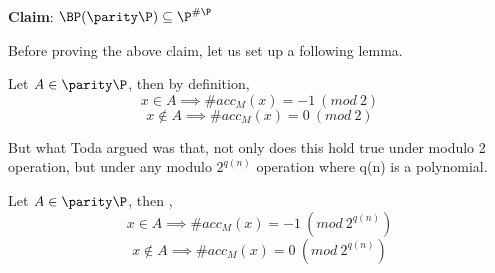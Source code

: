 
\textbf{Claim}: $\BP(\parity\P) \subseteq \P^{\#\P}$

Before proving the above claim, let us set up a following lemma. \newline

Let $A \in \parity \P$, then by definition, \newline
$$x \in A \implies \#acc_{M}(x) = -1~(mod~2)$$ 
$$x \notin A \implies \#acc_{M}(x) = 0~(mod~2)$$

But what Toda argued was that, not only does this hold true under modulo 2 operation, but under any modulo $2^{q(n)}$ operation where q(n) is a polynomial.

\begin{lemma}
 Let $A \in \parity \P$, then , \newline
$$x \in A \implies \#acc_{M}(x) = -1~(mod~2^{q(n)})$$ 
$$x \notin A \implies \#acc_{M}(x) = 0~(mod~2^{q(n)})$$
 
\end{lemma}
